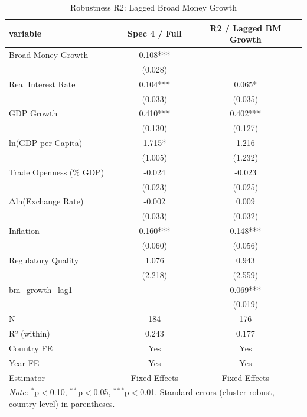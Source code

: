 \begin{table}[htbp]
\centering
\caption{Robustness R2: Lagged Broad Money Growth}
\label{tab:robustness_r2_lagged_bm}
\begin{tabular}{lcc}
\hline\hline
variable & Spec 4 / Full & R2 / Lagged BM Growth \\
\hline
Broad Money Growth & 0.108*** &  \\
 & (0.028) &  \\
Real Interest Rate & 0.104*** & 0.065* \\
 & (0.033) & (0.035) \\
GDP Growth & 0.410*** & 0.402*** \\
 & (0.130) & (0.127) \\
ln(GDP per Capita) & 1.715* & 1.216 \\
 & (1.005) & (1.232) \\
Trade Openness (\% GDP) & -0.024 & -0.023 \\
 & (0.023) & (0.025) \\
Δln(Exchange Rate) & -0.002 & 0.009 \\
 & (0.033) & (0.032) \\
Inflation & 0.160*** & 0.148*** \\
 & (0.060) & (0.056) \\
Regulatory Quality & 1.076 & 0.943 \\
 & (2.218) & (2.559) \\
bm\_growth\_lag1 &  & 0.069*** \\
 &  & (0.019) \\
\hline
N & 184 & 176 \\
R² (within) & 0.243 & 0.177 \\
Country FE & Yes & Yes \\
Year FE & Yes & Yes \\
Estimator & Fixed Effects & Fixed Effects \\
\hline\hline
\multicolumn{3}{l}{\textit{Note:} $^{*}$p$<$0.10, $^{**}$p$<$0.05, $^{***}$p$<$0.01. Standard errors (cluster-robust, country level) in parentheses.}
\end{tabular}
\end{table}